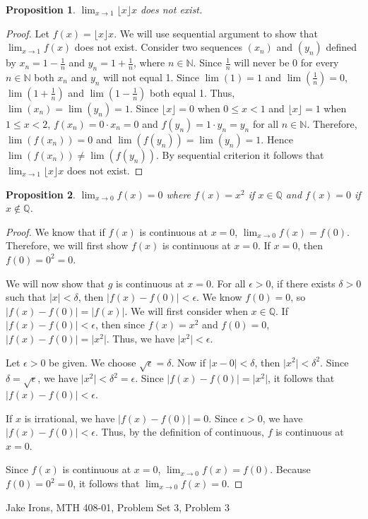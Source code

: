 \documentclass[11 pt]{article}
\newtheorem{proposition}{Proposition}
\newcommand{\newpar}{\vspace{.15in}\noindent}
\begin{document}
\newpar
\begin{proposition}
$\displaystyle{\lim_{x \to 1}\lfloor x\rfloor x}$ does not exist.
\end{proposition}
\begin{proof}
Let $f(x)=\lfloor x\rfloor x$. We will use sequential argument to show that  $\displaystyle{\lim_{x \to 1}}f(x)$ does not exist. Consider two sequences $(x_n)$ and $(y_n)$ defined by $x_n=1-\frac{1}{n}$ and $y_n=1+\frac{1}{n}$, where $n\in\mathbb{N}$. Since $\frac{1}{n}$ will never be 0 for every $n\in\mathbb{N}$ both $x_n$ and $y_n$ will not equal 1. Since $\lim(1)=1$ and $\lim(\frac{1}{n})=0$, $\lim(1+\frac{1}{n})$ and $\lim(1-\frac{1}{n})$ both equal 1. Thus, $\lim(x_n)=\lim(y_n)=1$. Since $\lfloor x\rfloor=0$ when $0\le x<1$ and $\lfloor x\rfloor=1$ when $1\le x<2$, $f(x_n)=0\cdot x_n=0$ and $f(y_n)=1\cdot y_n=y_n$ for all $n\in\mathbb{N}$. Therefore, $\lim(f(x_n))=0$ and $\lim(f(y_n))=\lim(y_n)=1$. Hence $\lim(f(x_n))\neq\lim(f(y_n))$. By sequential criterion it follows that $\displaystyle{\lim_{x \to 1}\lfloor x\rfloor x}$ does not exist.
\end{proof}

\newpar
\begin{proposition}
$\displaystyle{\lim_{x \to 0}}f(x)=0$ where $f(x)=x^2$ if $x\in\mathbb{Q}$ and $f(x)=0$ if $x\not\in\mathbb{Q}$.
\end{proposition}
\begin{proof}
We know that if $f(x)$ is continuous at $x=0$, $\displaystyle{\lim_{x \to 0}}f(x)=f(0)$. Therefore, we will first show $f(x)$ is continuous at $x=0$. If $x=0$, then $f(0)=0^2=0$.

\newpar
We will now show that $g$ is continuous at $x=0$. For all $\epsilon>0$, if there exists $\delta>0$ such that $\lvert x\rvert<\delta$, then $\lvert f(x)-f(0)\rvert<\epsilon$. We know $f(0)=0$, so $\lvert f(x)-f(0)\rvert=\lvert f(x)\rvert$. We will first consider when $x\in\mathbb{Q}$. If $\lvert f(x)-f(0)\rvert<\epsilon$, then since $f(x)=x^2$ and $f(0)=0$, $\lvert f(x)-f(0)\rvert=\lvert x^2\rvert$. Thus, we have $\lvert x^2\rvert<\epsilon$.

\newpar
Let $\epsilon>0$ be given. We choose $\sqrt{\epsilon}=\delta$. Now if $\lvert x-0\rvert<\delta$, then $\lvert x^2\rvert<\delta^2$. Since $\delta=\sqrt{\epsilon}$, we have $\lvert x^2\rvert<\delta^2=\epsilon$. Since $\lvert f(x)-f(0)\rvert=\lvert x^2\rvert$, it follows that $\lvert f(x)-f(0)\rvert<\epsilon$.

\newpar
If $x$ is irrational, we have $\lvert f(x)-f(0)\rvert=0$. Since $\epsilon>0$, we have $\lvert f(x)-f(0)\rvert<\epsilon$. Thus, by the definition of continuous, $f$ is continuous at $x=0$.

\newpar
Since $f(x)$ is continuous at $x=0$, $\displaystyle{\lim_{x \to 0}}f(x)=f(0)$. Because $f(0)=0^2=0$, it follows that $\displaystyle{\lim_{x \to 0}}f(x)=0$.


\end{proof}
\newpage
\noindent Jake Irons, MTH 408-01, Problem Set 3, Problem 3
\end{document}
